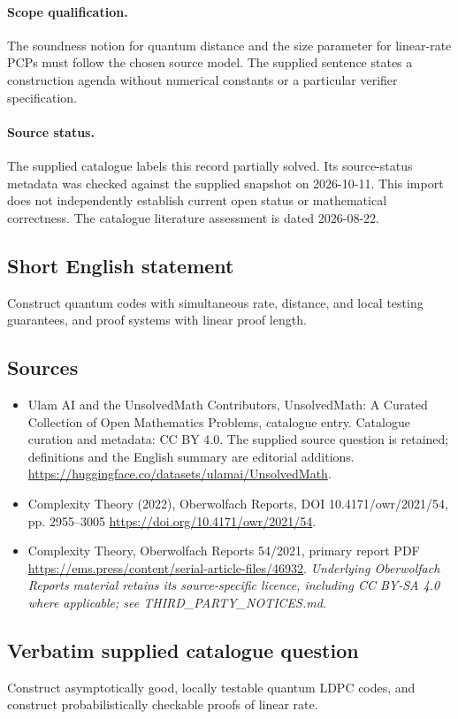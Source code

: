 \documentclass[11pt]{article}
\begin{document}
\paragraph{Scope qualification.}
The soundness notion for quantum distance and the size parameter for linear-rate PCPs must follow the chosen source model. The supplied sentence states a construction agenda without numerical constants or a particular verifier specification.
\paragraph{Source status.}
The supplied catalogue labels this record partially solved. Its source-status metadata was checked against the supplied snapshot on 2026-10-11. This import does not independently establish current open status or mathematical correctness. The catalogue literature assessment is dated 2026-08-22.
\subsection{Short English statement}
Construct quantum codes with simultaneous rate, distance, and local testing guarantees, and proof systems with linear proof length.
\subsection{Sources}
\begin{itemize}
\item[S1] Ulam AI and the UnsolvedMath Contributors, UnsolvedMath: A Curated Collection of Open Mathematics Problems, catalogue entry. Catalogue curation and metadata: CC BY 4.0. The supplied source question is retained; definitions and the English summary are editorial additions.
\url{https://huggingface.co/datasets/ulamai/UnsolvedMath}.
\item[S2] Complexity Theory (2022), Oberwolfach Reports, DOI 10.4171/owr/2021/54, pp. 2955--3005
\url{https://doi.org/10.4171/owr/2021/54}.
\item[S3] Complexity Theory, Oberwolfach Reports 54/2021, primary report PDF
\url{https://ems.press/content/serial-article-files/46932}.
\textit{Underlying Oberwolfach Reports material retains its source-specific licence, including CC BY-SA 4.0 where applicable; see THIRD\_PARTY\_NOTICES.md.}
\end{itemize}
\subsection{Verbatim supplied catalogue question}
Construct asymptotically good, locally testable quantum LDPC codes, and construct probabilistically checkable proofs of linear rate.
\end{document}
